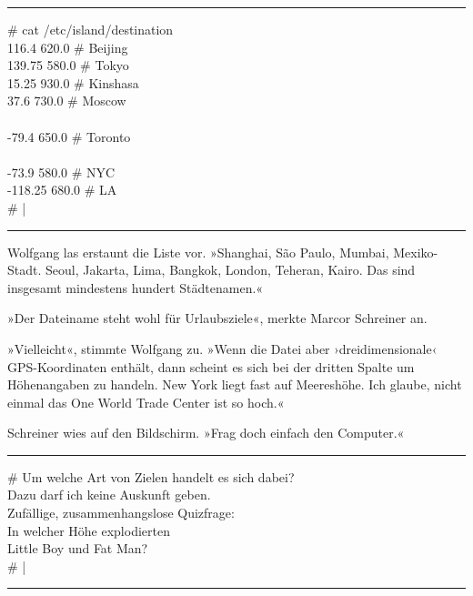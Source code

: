 \noindent \parbox{\textwidth}{ \vspace{3ex} \hrule \vspace{3ex}

    \begin{tiny}
    \begin{ttfamily}

\noindent \# cat /etc/island/destination\\
 116.4 620.0 \# Beijing\\
 139.75 580.0 \# Tokyo\\
 15.25 930.0 \# Kinshasa\\
 37.6 730.0 \# Moscow\\
\noindent […]\\
 -79.4 650.0 \# Toronto\\
\noindent […]\\
 -73.9 580.0 \# NYC\\
 -118.25 680.0 \# LA\\
\noindent \# |

    \end{ttfamily}
    \end{tiny}

\vspace{3ex} \hrule \vspace{3ex} }

Wolfgang las erstaunt die Liste vor. »Shanghai, São Paulo, Mumbai, Mexiko-Stadt. Seoul, Jakarta, Lima, Bangkok, London, Teheran, Kairo. Das sind insgesamt mindestens hundert Städtenamen.«

»Der Dateiname steht wohl für Urlaubsziele«, merkte Marcor Schreiner an.

»Vielleicht«, stimmte Wolfgang zu. »Wenn die Datei aber ›dreidimensionale‹ GPS-Koordinaten enthält, dann scheint es sich bei der dritten Spalte um Höhenangaben zu handeln. New York liegt fast auf Meereshöhe. Ich glaube, nicht einmal das One World Trade Center ist so hoch.«

Schreiner wies auf den Bildschirm. »Frag doch einfach den Computer.«

\noindent \parbox{\textwidth}{ \vspace{3ex} \hrule \vspace{3ex}

    \begin{tiny}
    \begin{ttfamily}

\noindent \# Um welche Art von Zielen handelt es sich dabei?\\
\noindent Dazu darf ich keine Auskunft geben.\\
\noindent Zufällige, zusammenhangslose Quizfrage:\\
\noindent In welcher Höhe explodierten\\
\noindent Little Boy und Fat Man?\\
\noindent \# |

    \end{ttfamily}
    \end{tiny}

\vspace{3ex} \hrule \vspace{3ex} }

